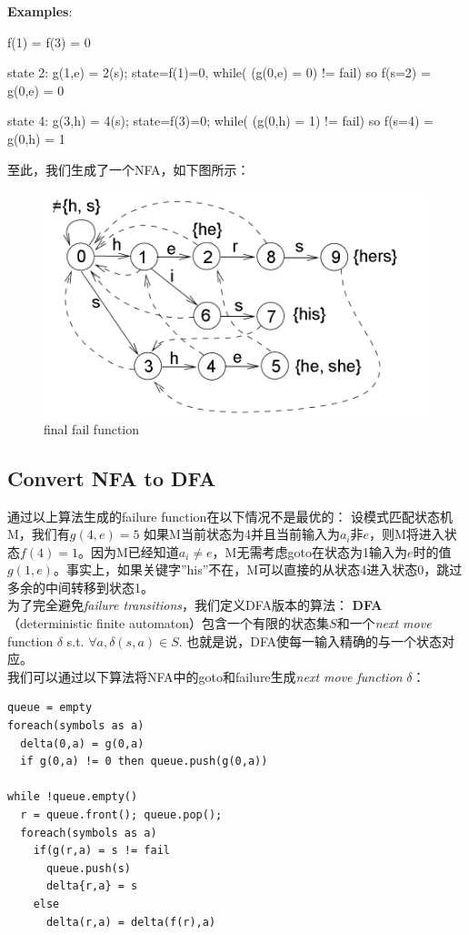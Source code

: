 \documentclass{article}
\begin{document}
\textbf{Examples}:
\begin{list}{}{}
  \item  f(1) = f(3) = 0
  \item  state 2: g(1,e) = 2(s); state=f(1)=0, while( (g(0,e) = 0) != fail) so f(s=2) = g(0,e) = 0
  \item  state 4: g(3,h) = 4(s); state=f(3)=0; while( (g(0,h) = 1) != fail) so f(s=4) = g(0,h) = 1
\end{list}
至此，我们生成了一个NFA，如下图所示：
\begin{figure}[h]
  \centering
  \caption{final fail function}
\includegraphics[scale=0.6]{res/failure.png}
\end{figure}
\subsection{Convert NFA to DFA}

通过以上算法生成的failure function在以下情况不是最优的：
设模式匹配状态机M，我们有$g(4,e) = 5$
如果M当前状态为4并且当前输入为$a_i$非$e$，则M将进入状态$f(4)=1$。因为M已经知道$a_i \ne e$，M无需考虑goto在状态为1输入为$e$时的值$g(1,e)$。事实上，如果关键字”his”不在，M可以直接的从状态4进入状态0，跳过多余的中间转移到状态1。\\
为了完全避免\textit{failure transitions}，我们定义DFA版本的算法：
\textbf{DFA}（deterministic finite automaton）包含一个有限的状态集$S$和一个\textit{next move} function $\delta$ s.t. $\forall a, \delta(s,a) \in S$. 也就是说，DFA使每一输入精确的与一个状态对应。\\
我们可以通过以下算法将NFA中的goto和failure生成\textit{next move function} $\delta$：
\begin{lstlisting}
queue = empty
foreach(symbols as a)
  delta(0,a) = g(0,a)
  if g(0,a) != 0 then queue.push(g(0,a))

while !queue.empty()
  r = queue.front(); queue.pop();
  foreach(symbols as a)
    if(g(r,a) = s != fail
      queue.push(s)
      delta{r,a} = s
    else
      delta(r,a) = delta(f(r),a)
\end{lstlisting}
\end{document}

